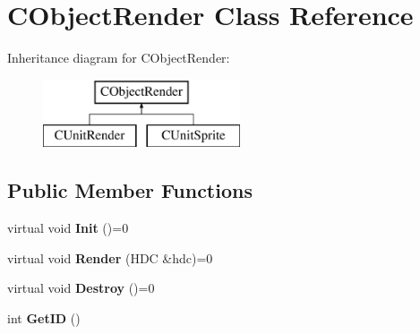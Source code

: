 \hypertarget{class_c_object_render}{}\section{C\+Object\+Render Class Reference}
\label{class_c_object_render}
Inheritance diagram for C\+Object\+Render\+:\begin{figure}[H]
\begin{center}
\leavevmode
\includegraphics[height=2.000000cm]{class_c_object_render}
\end{center}
\end{figure}
\subsection*{Public Member Functions}
\begin{DoxyCompactItemize}
\item 
virtual void {\bfseries Init} ()=0\hypertarget{class_c_object_render_ac20468f72bcd79ea777b7625dba25109}{}\label{class_c_object_render_ac20468f72bcd79ea777b7625dba25109}

\item 
virtual void {\bfseries Render} (H\+DC \&hdc)=0\hypertarget{class_c_object_render_a6e318c31fae3120641f55c7d806221b3}{}\label{class_c_object_render_a6e318c31fae3120641f55c7d806221b3}

\item 
virtual void {\bfseries Destroy} ()=0\hypertarget{class_c_object_render_a13a41e4b862acad19d154f5e77e8f5ca}{}\label{class_c_object_render_a13a41e4b862acad19d154f5e77e8f5ca}

\item 
int {\bfseries Get\+ID} ()\hypertarget{class_c_object_render_a5a5d85fb2e4ed997a0f237042837c238}{}\label{class_c_object_render_a5a5d85fb2e4ed997a0f237042837c238}

\end{DoxyCompactItemize}
